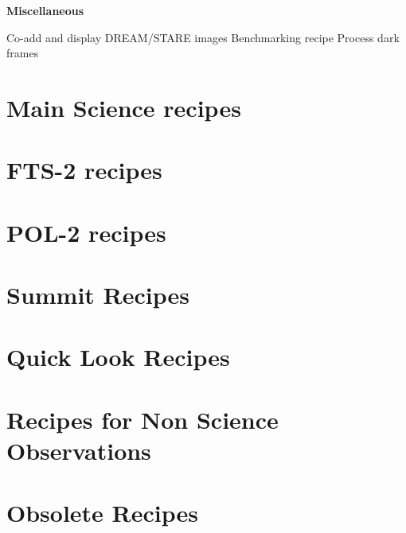 \documentclass[twoside,11pt,nolof]{starlink}
\begin{document}
\begin{small}
{\large
\begin{center}
\textbf{Miscellaneous}
\end{center}
}
\begin{description}
Co-add and display DREAM/STARE images
Benchmarking recipe
Process dark frames
\end{description}


\end{small}


\section{Main Science recipes}


\section{FTS-2 recipes}


\section{POL-2 recipes}


\section{Summit Recipes}


\section{Quick Look Recipes}


\section{Recipes for Non Science Observations}


\section{Obsolete Recipes}

\end{document}
